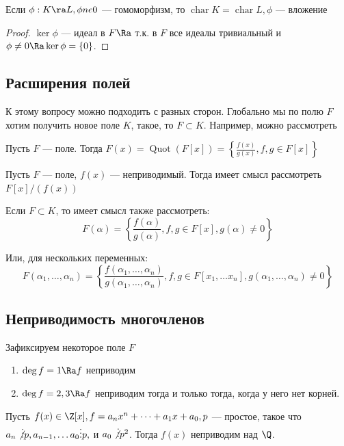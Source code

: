 \begin{note}
    Если \(\phi: K \ra L, \phi ne 0\) --- гомоморфизм, то \(\operatorname{char} K = \operatorname{char} L, \phi\) --- вложение
\end{note}
\begin{proof}
    \(\ker \phi\) --- идеал в \(F \Ra \) т.к. в \(F\) все идеалы тривиальный и \(\phi \ne 0 \Ra \ker \phi = \{0\}\).
\end{proof}

\subsection{Расширения полей}
К этому вопросу можно подходить с разных сторон. Глобально мы по полю \(F\) хотим получить новое поле \(K\), такое, то \(F \subset K\). Например, можно рассмотреть 

\begin{definition}
    Пусть \(F\) --- поле. Тогда \(F(x) = \operatorname{Quot}(F[x]) = \left\{\frac{f(x)}{g(x)}, f, g \in F[x]\right\}\)
\end{definition}

\begin{note}
    Пусть \(F\) --- поле, \(f(x)\) --- неприводимый. Тогда имеет смысл рассмотреть \(F[x]/(f(x))\)
\end{note}

Если \(F \subset K\), то имеет смысл также рассмотреть:
\[F(\alpha) = \left\{\frac{f(\alpha)}{g(\alpha)}, f, g \in F[x], g(\alpha) \ne 0\right\}\]

Или, для нескольких переменных:
\[F(\alpha_1, \dots, \alpha_n) = \left\{\frac{f(\alpha_1, \dots, \alpha_n)}{g(\alpha_1, \dots, \alpha_n)}, f, g \in F[x_1, \dots x_n], g(\alpha_1, \dots, \alpha_n) \ne 0\right\}\]

\subsection{Неприводимость многочленов}
Зафиксируем некоторое поле \(F\)
\begin{note}
    \begin{enumerate}
        \item \(\deg f = 1 \Ra f\) неприводим
        \item \(\deg f = 2, 3 \Ra f\) неприводим тогда и только тогда, когда у него нет корней.
    \end{enumerate}
\end{note}

\begin{proposition}
    Пусть \(f(x) \in \Z[x], f = a_nx^n + \dots + a_1x + a_0, p\) --- простое, такое что \(a_n \not\vdots p, a_{n - 1}, \dots a_0 \vdots p, \) и \(a_0 \not\vdots p^2\). Тогда \(f(x)\) неприводим над \(\Q\).
\end{proposition}

